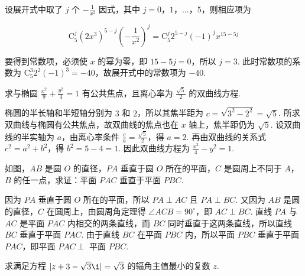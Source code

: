 \begin{solution}
设展开式中取了 \(j\) 个 \(-\frac{1}{x^2}\) 因式，其中 \(j=0\)，\(1\)，\(\ldots\)，\(5\)，则相应项为

\[
\mathrm C_5^j(2x^3)^{5-j}\left(-\frac{1}{x^2}\right)^j=\mathrm C_5^j2^{5-j}(-1)^j x^{15-5j}
\]

要得到常数项，必须使 \(x\) 的幂为零，即 \(15-5j=0\)，所以 \(j=3\). 此时常数项的系数为 \(\mathrm C_5^3 2^2(-1)^3=-40\)，故展开式中的常数项为 \(-40\).
\end{solution}

\begin{problem}
求与椭圆 \(\frac{x^2}{9} + \frac{y^2}{4} = 1\) 有公共焦点，且离心率为 \(\frac{\sqrt{5}}{2}\) 的双曲线方程.
\end{problem}

\begin{solution}
椭圆的半长轴和半短轴分别为 \(3\) 和 \(2\)，所以其焦半距为 \(c=\sqrt{3^2-2^2}=\sqrt{5}\). 所求双曲线与椭圆有公共焦点，故双曲线的焦点也在 \(x\) 轴上，焦半距仍为 \(\sqrt{5}\). 设双曲线的半实轴为 \(a\)，由离心率条件 \(\frac{c}{a}=\frac{\sqrt{5}}{2}\)，得 \(a=2\). 再由双曲线的关系式 \(c^2=a^2+b^2\)，得 \(b^2=5-4=1\). 因此双曲线方程为 \(\frac{x^2}{4}-y^2=1\).
\end{solution}

\begin{problem}
如图，\(AB\) 是圆 \(O\) 的直径，\(PA\) 垂直于圆 \(O\) 所在的平面，\(C\) 是圆周上不同于 \(A\)，\(B\) 的任一点，求证：平面 \(PAC\) 垂直于平面 \(PBC\).

\end{problem}

\begin{solution}
因为 \(PA\) 垂直于圆 \(O\) 所在的平面，所以 \(PA\perp AC\) 且 \(PA\perp BC\). 又因为 \(AB\) 是圆的直径，\(C\) 在圆周上，由圆周角定理得 \(\angle ACB=90^{\circ}\)，即 \(AC\perp BC\). 直线 \(PA\) 与 \(AC\) 是平面 \(PAC\) 内相交的两条直线，而 \(BC\) 同时垂直于这两条直线，所以直线 \(BC\) 垂直于平面 \(PAC\). 由于直线 \(BC\) 在平面 \(PBC\) 内，所以平面 \(PBC\) 垂直于平面 \(PAC\)，即平面 \(PAC\perp\) 平面 \(PBC\).
\end{solution}

\begin{problem}
求满足方程 \(|z + 3 - \sqrt{3}\i| = \sqrt{3}\) 的辐角主值最小的复数 \(z\).
\end{problem}

